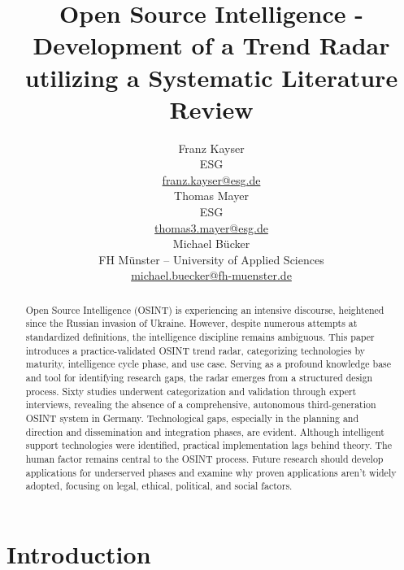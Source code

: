 \documentclass[10pt]{article}
\title{Open Source Intelligence - Development of a Trend Radar utilizing a Systematic Literature Review}
\author{Franz Kayser \\
  ESG \\
  {\underline{ franz.kayser@esg.de}} \\\And
  Thomas Mayer \\
  ESG  \\
  {\underline{ thomas3.mayer@esg.de} }\\\And 
  Michael Bücker \\
  FH Münster -- University of Applied Sciences\\
  {\underline{michael.buecker@fh-muenster.de}} \\}
\date{}
\begin{document}
\maketitle
\begin{abstract}
    Open Source Intelligence (OSINT) is experiencing an intensive discourse,
    heightened since the Russian invasion of Ukraine. However, despite numerous attempts
    at standardized definitions, the intelligence discipline remains ambiguous. This paper
    introduces a practice-validated OSINT trend radar, categorizing technologies by maturity,
    intelligence cycle phase, and use case. Serving as a profound knowledge base and tool for
    identifying research gaps, the radar emerges from a structured design process. Sixty
    studies underwent categorization and validation through expert interviews,
    revealing the absence of a comprehensive, autonomous third-generation OSINT
    system in Germany. Technological gaps, especially in the planning and direction and
    dissemination and integration phases, are evident. Although intelligent support
    technologies were identified, practical implementation lags behind theory. The human
    factor remains central to the OSINT process. Future research should develop
    applications for underserved phases and examine why proven applications aren't widely
    adopted, focusing on legal, ethical, political, and social factors.
\end{abstract}

\section{Introduction} \label{sec:introduction}
\end{document}
